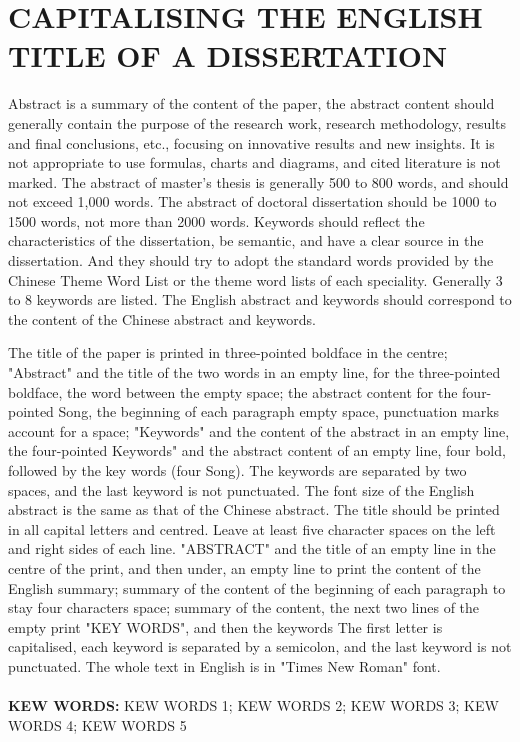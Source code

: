 \documentclass[UTF8,12pt,AutoFakeBold,fontset=fandol]{ctexart}
\begin{document}
	\section*{CAPITALISING THE ENGLISH TITLE OF A DISSERTATION}
	\begin{enabstract}
		\fontsize{14pt}{17.5pt}\selectfont%
		
		Abstract is a summary of the content of the paper, the abstract content should generally contain the purpose of the research work, research methodology, results and final conclusions, etc., focusing on innovative results and new insights. It is not appropriate to use formulas, charts and diagrams, and cited literature is not marked. The abstract of master's thesis is generally 500 to 800 words, and should not exceed 1,000 words. The abstract of doctoral dissertation should be 1000 to 1500 words, not more than 2000 words. Keywords should reflect the characteristics of the dissertation, be semantic, and have a clear source in the dissertation. And they should try to adopt the standard words provided by the Chinese Theme Word List or the theme word lists of each speciality. Generally 3 to 8 keywords are listed. The English abstract and keywords should correspond to the content of the Chinese abstract and keywords.
		\par
		The title of the paper is printed in three-pointed boldface in the centre; "Abstract" and the title of the two words in an empty line, for the three-pointed boldface, the word between the empty space; the abstract content for the four-pointed Song, the beginning of each paragraph empty space, punctuation marks account for a space; "Keywords" and the content of the abstract in an empty line, the four-pointed Keywords" and the abstract content of an empty line, four bold, followed by the key words (four Song). The keywords are separated by two spaces, and the last keyword is not punctuated.
		The font size of the English abstract is the same as that of the Chinese abstract. The title should be printed in all capital letters and centred. Leave at least five character spaces on the left and right sides of each line. "ABSTRACT" and the title of an empty line in the centre of the print, and then under, an empty line to print the content of the English summary; summary of the content of the beginning of each paragraph to stay four characters space; summary of the content, the next two lines of the empty print "KEY WORDS", and then the keywords The first letter is capitalised, each keyword is separated by a semicolon, and the last keyword is not punctuated. The whole text in English is in "Times New Roman" font.
		\\
		\\
		\textbf{KEW WORDS:} KEW WORDS 1;  KEW WORDS 2;  KEW WORDS 3;  KEW WORDS 4;  KEW WORDS 5
	\end{enabstract}
	\pagebreak
	
\end{document}
